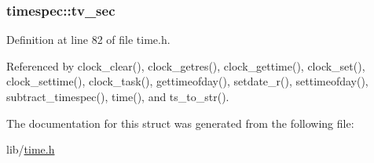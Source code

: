 \hypertarget{structtimespec_afc3302668d7cb5952f590da69fdd4955}{
\subsubsection[{tv\-\_\-sec}]{ timespec\-::tv\-\_\-sec}}\label{structtimespec_afc3302668d7cb5952f590da69fdd4955}


Definition at line 82 of file time.\-h.



Referenced by clock\-\_\-clear(), clock\-\_\-getres(), clock\-\_\-gettime(), clock\-\_\-set(), clock\-\_\-settime(), clock\-\_\-task(), gettimeofday(), setdate\-\_\-r(), settimeofday(), subtract\-\_\-timespec(), time(), and ts\-\_\-to\-\_\-str().



The documentation for this struct was generated from the following file\-:\begin{DoxyCompactItemize}
\item 
lib/\hyperlink{time_8h}{time.\-h}\end{DoxyCompactItemize}
